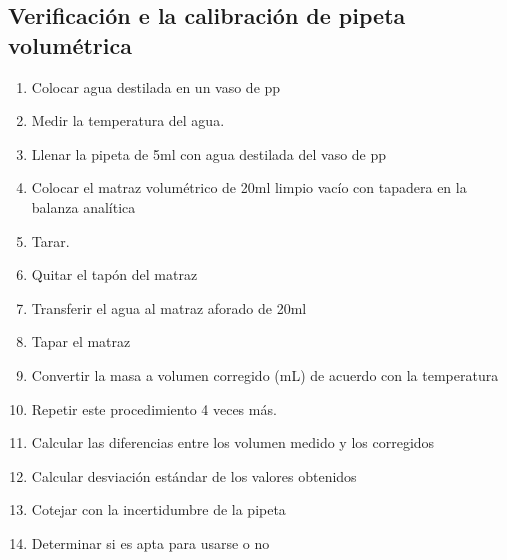\subsection{Verificación e la calibración de pipeta volumétrica}
\begin{enumerate}
    \item Colocar agua destilada en un vaso de pp
    \item Medir la temperatura del agua.
    \item Llenar la pipeta de 5ml con agua destilada del vaso de pp
    \item Colocar el matraz volumétrico de 20ml limpio vacío con tapadera en la balanza analítica
    \item Tarar. 
    \item Quitar el tapón del matraz
    \item Transferir el agua al matraz aforado de 20ml
    \item Tapar el matraz
    \item Convertir la masa a volumen corregido (mL) de acuerdo con la temperatura
    \item Repetir este procedimiento 4 veces más. 
    \item Calcular las diferencias entre los volumen medido y los corregidos
    \item Calcular desviación estándar de los valores obtenidos
    \item Cotejar con la incertidumbre de la pipeta
    \item Determinar si es apta para usarse o no
\end{enumerate}


